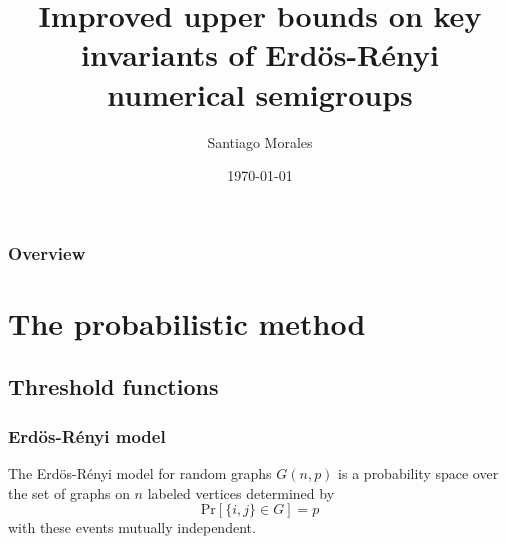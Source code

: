 \documentclass{beamer}
\title[Random numerical semigroups]{Improved upper bounds on key invariants of Erdös-Rényi numerical semigroups} %
\author{Santiago Morales} %
\institute[UC Davis] %
{
University of California, Davis\\ %
\medskip
\textit{moralesduarte@ucdavis.edu} %
}
\date{\today} %
\def\Pr{\ensuremath{\mathrm{Pr}}}
\begin{document}
\begin{frame}
\titlepage %
\end{frame}

\begin{frame}
\frametitle{Overview} %
\tableofcontents %
\end{frame}


\section{The probabilistic method} %

\subsection{Threshold functions} %

\begin{frame}
\frametitle{Erdös-Rényi model}
\begin{definition}\label{def:probmet:ermodel}
    The Erdös-Rényi model for random graphs $G(n, p)$ is a probability space over the set of graphs on $n$ labeled vertices determined by
    \[\Pr[\{i, j\} \in G] = p\] 
    with these events mutually independent.
\end{definition}
\end{frame}
\end{document}

